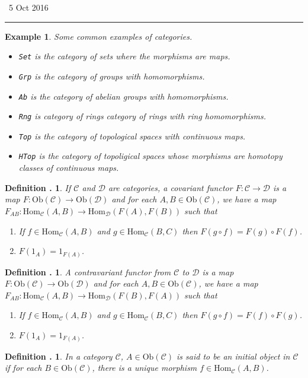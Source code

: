 \documentclass[twoside]{report}
\newcommand{\Ob}{\textrm{Ob}}
\newcommand{\Hom}{\textrm{Hom}}
\newcommand{\fanC}{\mathscr{C}}
\newcommand{\fanD}{\mathscr{D}}
\newcommand{\cat}[1]{\texttt{#1}}
\newcounter{Lecture}
\newcommand{\newLec}[1]{
  \stepcounter{Lecture}
  \noindent{\Large\bf Lecture \arabic{Lecture}} \, #1 \hfill  \rule[1ex]{2.5in}{.1pt} \vspace{1em}
}
\theoremstyle{myts}
\newcounter{c}[Lecture]
\newtheorem{dfn}[c]{Definition \arabic{Lecture}.}
\newtheorem*{epl}{Example}
\newcounter{ex}
\begin{document}
\newLec{5 Oct 2016}

\begin{epl} Some common examples of categories.
  \begin{itemize}
    \item \cat{Set} is the category of sets where the morphisms are maps.
    \item \cat{Grp} is the category of groups with homomorphisms.
    \item \cat{Ab} is the category of abelian groups with homomorphisms.
    \item \cat{Rng} is category of rings category of rings with ring homomorphisms.
    \item \cat{Top} is the category of topological spaces with continuous maps.
    \item \cat{HTop} is the category of topoligical spaces whose morphisms are homotopy classes of continuous maps.
  \end{itemize}
\end{epl}

\begin{dfn}
  If $\fanC$ and $\fanD$ are categories, a \emph{covariant functor} \( F : \fanC \to \fanD \) is a map \( F : \Ob(\fanC) \to \Ob (\fanD) \) and for each \( A, B \in \Ob(\fanC) \), we have a map \( F_{AB} : \Hom_\fanC(A,B) \to \Hom_\fanD(F(A), F(B) ) \) such that
  \begin{enumerate}[(1)]
    \item If \( f\in \Hom_\fanC(A,B) \) and \( g\in \Hom_\fanC (B,C) \) then \( F(g\circ f) = F(g) \circ F(f) \).
    \item \( F(1_A) = 1_{F(A)} \).
  \end{enumerate}
\end{dfn}

\begin{dfn}
  A \emph{contravariant functor} from $\fanC$ to $\fanD$ is a map \( F: \Ob(\fanC) \to \Ob(\fanD) \) and for each \( A, B \in \Ob(\fanC) \), we have a map \( F_{AB} : \Hom_\fanC(A,B) \to \Hom_\fanD(F(B), F(A) ) \) such that
  \begin{enumerate}[(1)]
    \item If \( f\in \Hom_\fanC(A,B) \) and \( g\in \Hom_\fanC (B,C) \) then \( F(g\circ f) = F(f) \circ F(g) \).
    \item \( F(1_A) = 1_{F(A)} \).
  \end{enumerate}
\end{dfn}

\begin{dfn}
  In a category $\fanC$, \( A\in \Ob(\fanC) \) is said to be an \emph{initial object} in $\fanC$ if for each \( B\in \Ob(\fanC) \), there is a unique morphism \( f \in \Hom_\fanC (A,B) \).
\end{dfn}
\end{document}
